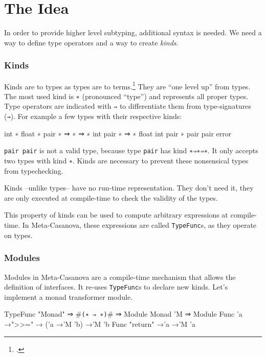 \section{The Idea}
\begin{multicols}{2}\noindent
  In order to provide higher level subtyping, additional syntax is needed.
  We need a way to define type operators and a way to create \textit{kinds}.

  \subsubsection*{Kinds}
  Kinds are to types as types are to terms.\footcite[Chapter~30]{Pierce02}
  They are ``one level up'' from types.
  The most used kind is \texttt{∗} (pronounced ``type'') and represents all proper types.
  Type operators are indicated with \texttt{⇒} to differentiate them from type-signatures (\texttt{→}).
  For example a few types with their respective kinds:
  \begin{code}
  int             ∗
  float           ∗
  pair            ∗ ⇒ ∗ ⇒ ∗
  int pair        ∗ ⇒ ∗ 
  float int pair  ∗
  pair pair       error
  \end{code}

  \noindent
  \texttt{pair pair} is not a valid type, because type \texttt{pair} has kind \texttt{∗⇒∗⇒∗}.
  It only accepts two types with kind \texttt{∗}.
  Kinds are necessary to prevent these nonsensical types from typechecking.

  Kinds --unlike types-- have no run-time representation.
  They don't need it, they are only executed at compile-time to check the validity of the types.

  This property of kinds can be used to compute arbitrary expressions at compile-time.
  In Meta-Casanova, these expressions are called \texttt{TypeFunc}s, as they operate on types.

  \subsubsection*{Modules}
  \noindent
  Modules in Meta-Casanova are a compile-time mechanism that allows the definition of interfaces.
  It re-uses \texttt{TypeFunc}s to declare new kinds.
  Let's implement a monad transformer module.
  
  \begin{code}[caption=A generic monad transformer]
  TypeFunc "Monad" ⇒ #\verb|(∗ ⇒ ∗)|# ⇒ Module
  Monad 'M ⇒ Module {
    Func 'a →">>=" → ('a →'M 'b) →'M 'b
    Func "return" →'a →'M 'a
  }
  \end{code}


\end{multicols}

